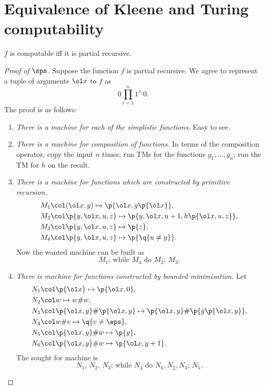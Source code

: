 \section{Equivalence of Kleene and Turing computability}

\begin{theorem}
  $f$ is computable iff it is partial recursive.  
\end{theorem}

\begin{proof}[Proof of $\sps$]
  Suppose the function $f$ is partial recursive.
  We agree to represent a tuple of arguments $\ol x$ to $f$ as
  $$ 0 \prod_{i=1}^n 1^{x_i} 0. $$
  The proof is as follows:
  \begin{enumerate}
    \item \emph{There is a machine for each of the simplistic functions.} Easy to see.
    \item \emph{There is a machine for composition of functions.} In terms of the composition operator,
    copy the input $n$ times; 
  run TMs for the functions $g_1, \dots, g_n$;
  run the TM for $h$ on the result.
    \item \emph{There is a machine for functions which are constructed by primitive recursion.}
    \begin{align*}
      M_1 \col & (\ol x, y) \mapsto \p{\ol x, g\p{\ol x}}, \\
      M_2 \col & \p{y, \ol x, u, z} \mapsto \p{y, \ol x, u+1, h\p{\ol x, u, z}}, \\
      M_3 \col & \p{y, \ol x, u, z} \mapsto \p{z}, \\
      M_4 \col & \p{y, \ol x, u, z} \mapsto \p{\q{u \ne y}}.
    \end{align*}
    Now the wanted machine can be built as
    $$ \text{$M_1$; while $M_4$ do $M_2$; $M_3$}. $$
    \item \emph{There is machine for functions constructed by bounded minimisation.}
    Let
    \begin{align*}
      N_1 \col & \p{\ol x} \mapsto \p{\ol x, 0}, \\
      N_2 \col & w \mapsto w \# w, \\
      N_3 \col & \p{\ol x, y} \# \p{\ol x, y} \mapsto \p{\ol x, y} \# \p{g\p{\ol x, y}}, \\
      N_4 \col & w \# v \mapsto \q{v \ne \eps}, \\
      N_5 \col & \p{\ol x, y} \# w \mapsto \p{y}, \\
      N_6 \col & \p{\ol x, y} \# w \mapsto \p{\ol x, y+1}.
    \end{align*}
    The sought for machine is
    $$ \text{$N_1$, $N_2$, $N_3$; while $N_4$ do $N_6, N_2, N_3$; $N_5$}. $$
  \end{enumerate}
\end{proof}

